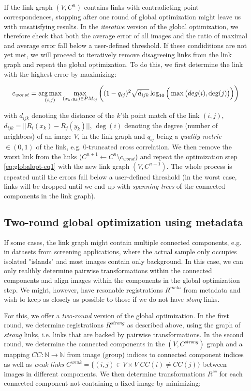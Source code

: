 If the link graph $(V,C^n)$ contains links with contradicting point correspondences, stopping after one round of global optimization might leave us with unsatisfying results. In the \emph{iterative} version of the global optimization, we therefore check that both the average error of all images and the ratio of maximal and average error fall below a user-defined threshold. If these condiditions are not yet met, we will proceed to iteratively remove disagreeing links from the link graph and repeat the global optimization. To do this, we first determine the link with the highest error by maximizing:

\begin{equation}
\label{eq:globalopt-eq3}
c_{worst} = \operatorname*{arg\,max}_{(i,j)} \max_{(x_k, y_k) \in PM_{ij}}\bigg( (1-q_{ij})^2 \sqrt{d_{ijk}} \log_{10}\Big(\max\big(deg(i), \deg(j)\big)\Big)\bigg) 
\end{equation}

with $d_{ijk}$ denoting the distance of the $k$'th point match of the link $(i,j)$, $d_{ijk} = || R_{i}(x_k) - R_{j}(y_k) ||$, $\deg(i)$ denoting the degree (number of neighbors) of an image $V_i$ in the link graph and $q_{ij}$ being a \emph{quality metric} $\in (0,1)$ of the link, e.g. 0-truncated cross correlation. We then remove the worst link from the links ($C^{n+1} \leftarrow C^{n} \setminus c_{worst}$) and repeat the optimization step \ref{eq:globalopt-eq1} with the new link graph $(V, C^{n+1})$. The whole process is repeated until the errors fall below a user-defined threshold (in the worst case, links will be dropped until we end up with \emph{spanning trees} of the connected components in the link graph). 

\subsection*{Two-round global optimization using metadata}

If some cases, the link graph might contain multiple connected components, e.g. in datasets from screening applications, where the actual sample only occupies isolated "islands" and most images contain only background. In this case, we can only realibly determine pairwise transformations within the connected components and align images within the components in the global optimization step. We might, however, have resonable registrations $R^{meta}$ from metadata and wish to keep as closely as possible to those if we do not have \emph{stong} links.

For this, we offer a \emph{two-round} version of the global optimization. In the first round, we determine registrations $R^{strong}$ as described above, using the graph of \emph{strong} links, i.e. links that are backed by pairwise transformations. In the second round, we determine the connected components in the $(V, C^{strong} )$ graph and a mapping $CC: \mathbb{N} \to \mathbb{N}$ from image (group) indices to  connected component indices as well as \emph{weak links} $C^{weak} = \{(i,j) \in V \times V | CC(i) \neq CC(j) \}$ between images in different components. We then determine transformations $R^{cc}$ for each connected component not containing a fixed image by minimizing:

